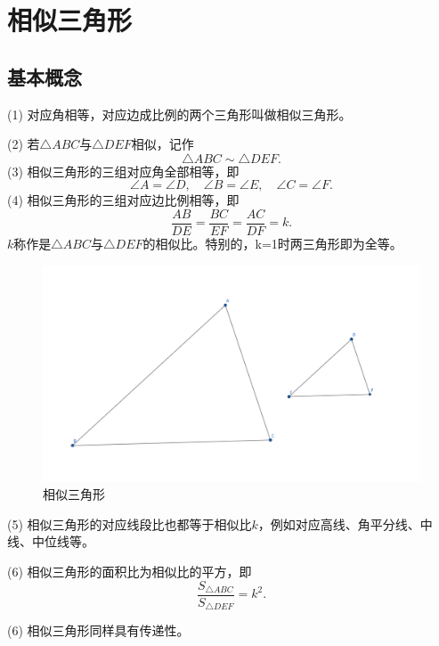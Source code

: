 \section{相似三角形}
\subsection{基本概念}
\begin{definition}[相似关系]
(1) 对应角相等，对应边成比例的两个三角形叫做相似三角形。

(2) 若$\triangle ABC$与$\triangle DEF$相似，记作
    $$\triangle ABC \sim \triangle DEF.$$
(3) 相似三角形的三组对应角全部相等，即
    $$\angle A = \angle D, \quad \angle B = \angle E, \quad \angle C = \angle F.$$
(4) 相似三角形的三组对应边比例相等，即
    $$\frac{AB}{DE} = \frac{BC}{EF} = \frac{AC}{DF}=k.$$
    $k$称作是$\triangle ABC$与$\triangle DEF$的相似比。特别的，k=1时两三角形即为全等。
\end{definition}

\begin{figure}[H]
    \centering
    \includegraphics[width=0.8\linewidth]{figures/相似三角形.png}
    \caption{相似三角形}
\end{figure}
\begin{proposition}
    (5) 相似三角形的对应线段比也都等于相似比$k$，例如对应高线、角平分线、中线、中位线等。
    
    (6) 相似三角形的面积比为相似比的平方，即
    $$\frac{S_{\triangle ABC}}{S_{\triangle DEF}} = k^2.$$
    
    (6) 相似三角形同样具有传递性。
\end{proposition}

